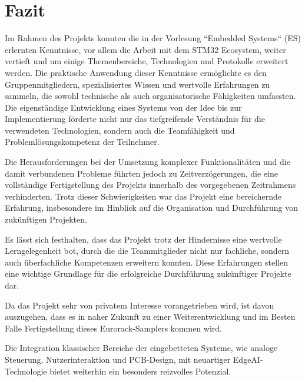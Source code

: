 \newpage
\section{Fazit}

Im Rahmen des Projekts konnten die in der Vorlesung ``Embedded Systems`` (ES) erlernten Kenntnisse, vor allem die Arbeit mit dem STM32 Ecosystem, weiter vertieft und um einige Themenbereiche, Technologien und Protokolle erweitert werden. 
Die praktische Anwendung dieser Kenntnisse ermöglichte es den Gruppenmitgliedern, spezialisiertes Wissen und wertvolle Erfahrungen zu sammeln, die sowohl technische als auch organisatorische Fähigkeiten umfassten. Die eigenständige Entwicklung eines Systems von der Idee bis zur Implementierung förderte nicht nur das tiefgreifende Verständnis für die verwendeten Technologien, sondern auch die Teamfähigkeit und Problemlösungskompetenz der Teilnehmer.

Die Herausforderungen bei der Umsetzung komplexer Funktionalitäten und die damit verbundenen Probleme führten jedoch zu Zeitverzögerungen, die eine vollständige Fertigstellung des Projekts innerhalb des vorgegebenen Zeitrahmens verhinderten. Trotz dieser Schwierigkeiten war das Projekt eine bereichernde Erfahrung, insbesondere im Hinblick auf die Organisation und Durchführung von zukünftigen Projekten.

Es lässt sich festhalten, dass das Projekt trotz der Hindernisse eine wertvolle Lerngelegenheit bot, durch die die Teammitglieder nicht nur fachliche, sondern auch überfachliche Kompetenzen erweitern konnten. Diese Erfahrungen stellen eine wichtige Grundlage für die erfolgreiche Durchführung zukünftiger Projekte dar.

Da das Projekt sehr von privatem Interesse vorangetrieben wird, ist davon auszugehen, dass es in naher Zukunft zu einer Weiterentwicklung und im Besten Falle Fertigstellung dieses Eurorack-Samplers kommen wird.

Die Integration klassischer Bereiche der eingebetteten Systeme, wie analoge Steuerung, Nutzerinteraktion und PCB-Design, mit neuartiger EdgeAI-Technologie bietet weiterhin ein besonders reizvolles Potenzial. 
